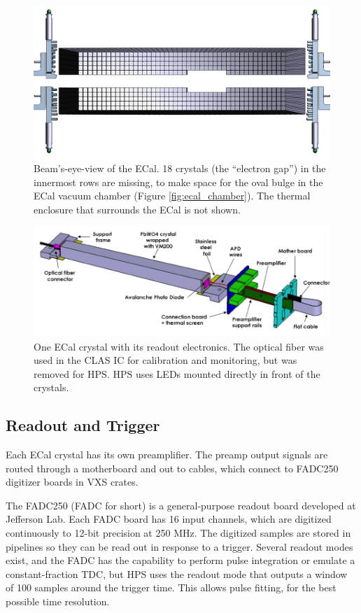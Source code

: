 \begin{figure}[htp]
    \includegraphics[width=\textwidth]{detector/figs/ECal}
    \caption{Beam's-eye-view of the ECal.
    18 crystals (the ``electron gap'') in the innermost rows are missing, to make space for the oval bulge in the ECal vacuum chamber (Figure \ref{fig:ecal_chamber}).
    The thermal enclosure that surrounds the ECal is not shown.}
    \label{fig:ecal}
\end{figure}

\begin{figure}[htp]
    \includegraphics[width=\textwidth]{detector/figs/ecal_module}
    \caption{One ECal crystal with its readout electronics. The optical fiber was used in the CLAS IC for calibration and monitoring, but was removed for HPS. HPS uses LEDs mounted directly in front of the crystals.}
    \label{fig:ecal_module}
\end{figure}

\subsection{Readout and Trigger}
Each ECal crystal has its own preamplifier.
The preamp output signals are routed through a motherboard and out to cables, which connect to FADC250 digitizer boards in VXS crates.

The FADC250 (FADC for short) is a general-purpose readout board developed at Jefferson Lab.
Each FADC board has 16 input channels, which are digitized continuously to 12-bit precision at 250 MHz.
The digitized samples are stored in pipelines so they can be read out in response to a trigger.
Several readout modes exist, and the FADC has the capability to perform pulse integration or emulate a constant-fraction TDC, but HPS uses the readout mode that outputs a window of 100 samples around the trigger time.
This allows pulse fitting, for the best possible time resolution.

